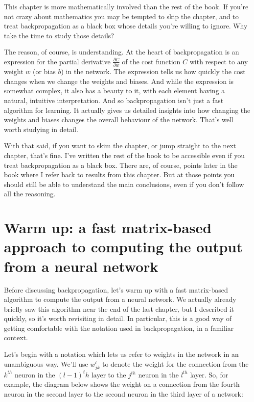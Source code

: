 \documentclass[a4paper,12pt]{report}%
\begin{document}
\smallskip

This chapter is more mathematically involved than the rest of the book. If you're not crazy about mathematics you may be tempted to skip the chapter, and to treat backpropagation as a black box whose details you're willing to ignore. Why take the time to study those details?

\smallskip

The reason, of course, is understanding. At the heart of backpropagation is an expression for the partial derivative $\frac{\partial C}{\partial w}$ of the cost function $C$ with respect to any weight $w$ (or bias $b$) in the network. The expression tells us how quickly the cost changes when we change the weights and biases. And while the expression is somewhat complex, it also has a beauty to it, with each element having a natural, intuitive interpretation. And so backpropagation isn't just a fast algorithm for learning. It actually gives us detailed insights into how changing the weights and biases changes the overall behaviour of the network. That's well worth studying in detail.

\smallskip

With that said, if you want to skim the chapter, or jump straight to the next chapter, that's fine. I've written the rest of the book to be accessible even if you treat backpropagation as a black box. There are, of course, points later in the book where I refer back to results from this chapter. But at those points you should still be able to understand the main conclusions, even if you don't follow all the reasoning.

\section{Warm up: a fast matrix-based approach to computing the output from a neural network}
Before discussing backpropagation, let's warm up with a fast matrix-based algorithm to compute the output from a neural network. We actually already briefly saw this algorithm near the end of the last chapter, but I described it quickly, so it's worth revisiting in detail. In particular, this is a good way of getting comfortable with the notation used in backpropagation, in a familiar context.

Let's begin with a notation which lets us refer to weights in the network in an unambiguous way. We'll use $w_{jk}^{l}$ to denote the weight for the connection from the $k^{th}$ neuron in the $(l−1)^th$ layer to the $j^{th}$ neuron in the $l^{th}$ layer. So, for example, the diagram below shows the weight on a connection from the fourth neuron in the second layer to the second neuron in the third layer of a network:
\end{document}
